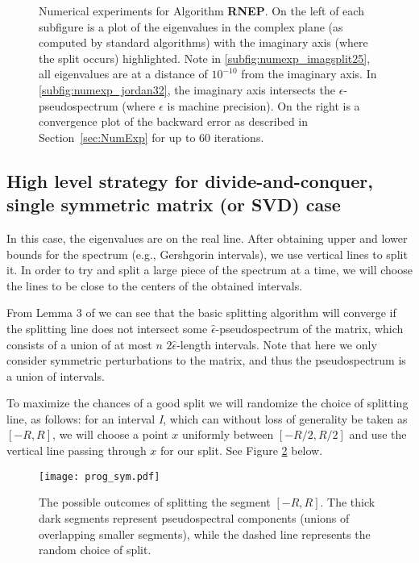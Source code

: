 \documentclass{article}
\theoremstyle{definition}
\begin{document}
\begin{figure}
\centering
{}
\caption{Numerical experiments for Algorithm \textbf{RNEP}.  On the left of each subfigure
is a plot of the eigenvalues in the complex plane (as computed by standard algorithms)
with the imaginary axis (where the split occurs) highlighted.  Note in
\ref{subfig:numexp_imagsplit25}, all eigenvalues are at a distance of $10^{-10}$ from
the imaginary axis.  In \ref{subfig:numexp_jordan32}, the imaginary axis intersects the
$\epsilon$-pseudospectrum (where $\epsilon$ is machine precision).  On the right is a
convergence plot of the backward error as described in Section~\ref{sec:NumExp} for up
to $60$ iterations.}
\label{fig:numexp_hard}
\end{figure}

\subsection{High level strategy for divide-and-conquer, single symmetric matrix (or SVD) case}

In this case, the eigenvalues are on the real line. After obtaining upper and lower bounds for the spectrum (e.g., Gershgorin intervals),  we use vertical lines to split it. In order to try and split a large piece of the spectrum at a time, we will choose the lines to be close to the centers of the obtained intervals. 

From Lemma 3 of \cite{baidemmelgu94} we can see that the basic splitting algorithm will converge 
if the splitting line does not intersect some $\hat{\epsilon}$-pseudospectrum of the matrix, 
which consists of a union of at most $n$ $2\hat{\epsilon}$-length intervals. 
Note that here we only consider symmetric perturbations to the matrix, 
and thus the pseudospectrum is a union of intervals.

To maximize the chances of a good split we will randomize the choice of splitting line, as follows: for an interval \emph{I}, which can without loss of generality be taken as $[-R,R]$, we will choose a point $x$ uniformly between $[-R/2, R/2]$ and use the vertical line passing through $x$ for our split. See Figure \ref{prog_symm} below.

\begin{figure}[ht!]
\begin{center}
\texttt{[image: prog\_sym.pdf]}
\caption{The possible outcomes of splitting the segment $[-R, R]$. The thick dark segments represent pseudospectral components (unions of overlapping smaller segments), while the dashed line represents the random choice of split.} \label{prog_symm}
\end{center}
\end{figure}
\end{document}
